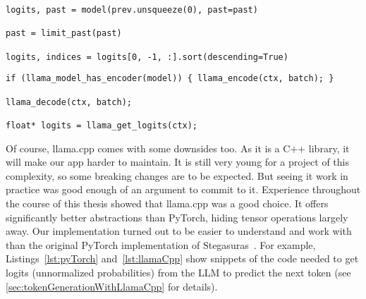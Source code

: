 \vspace{0.25cm}

\begin{lstlisting}[caption={[PyTorch]{Snippet of the Stegasuras code needed to get logits from a \gls{LLM} using PyTorch~\cite{zieglerHarvardnlpNeuralSteganography2025}. Tensor operations are exposed whenever indices of an object are queried.}}, label={lst:pyTorch}]
logits, past = model(prev.unsqueeze(0), past=past)

past = limit_past(past)

logits, indices = logits[0, -1, :].sort(descending=True)
\end{lstlisting}

\begin{lstlisting}[caption={[llama.cpp]{Snippet of our code needed to get logits from a \gls{LLM} using llama.cpp. No tensor operations are exposed.}}, label={lst:llamaCpp}]
if (llama_model_has_encoder(model)) { llama_encode(ctx, batch); }

llama_decode(ctx, batch);

float* logits = llama_get_logits(ctx);
\end{lstlisting}

Of course, llama.cpp comes with some downsides too. As it is a C++ library, it will make our app harder to maintain. It is still very young for a project of this complexity, so some breaking changes are to be expected. But seeing it work in practice was good enough of an argument to commit to it. Experience throughout the course of this thesis showed that llama.cpp was a good choice. It offers significantly better abstractions than PyTorch, hiding tensor operations largely away. Our implementation turned out to be easier to understand and work with than the original PyTorch implementation of Stegasuras~\cite{zieglerHarvardnlpNeuralSteganography2025}. For example, Listings~\ref{lst:pyTorch} and~\ref{lst:llamaCpp} show snippets of the code needed to get logits (unnormalized probabilities) from the \gls{LLM} to predict the next token (see \cref{sec:tokenGenerationWithLlamaCpp} for details).

